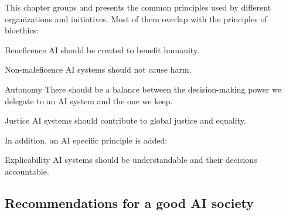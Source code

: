 This chapter groups and presents the common principles used by different organizations and initiatives.
Most of them overlap with the principles of bioethics:
\begin{descriptionlist}
    \item[Beneficence] 
        AI should be created to benefit humanity.

    \item[Non-maleficence] 
        AI systems should not cause harm.
    
    \item[Autonomy] 
        There should be a balance between the decision-making power we delegate to an AI system and the one we keep.
    
    \item[Justice] 
        AI systems should contribute to global justice and equality.
\end{descriptionlist}

In addition, an AI specific principle is added:
\begin{descriptionlist}
    \item[Explicability] 
        AI systems should be understandable and their decisions accountable.
\end{descriptionlist}


\subsection{Recommendations for a good AI society}

